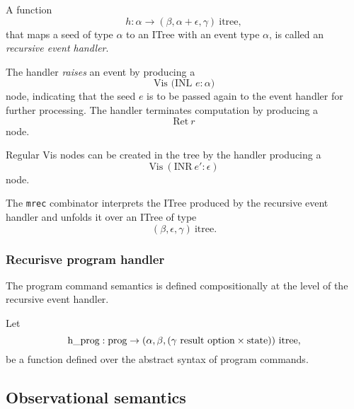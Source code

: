\documentclass[a4paper]{amsbook}
\begin{document}
A function
\begin{equation*}
  h : \alpha \to (\beta, \alpha + \epsilon, \gamma)\ \text{itree},
\end{equation*}
that maps a seed of type $\alpha$ to an ITree with an event type $\alpha$, is called an \emph{recursive event handler}.

The handler \emph{raises} an event by producing a
\begin{equation*}
  \text{Vis (INL } e:\alpha \text{)}
\end{equation*}
node, indicating that the seed $e$ is to be passed again to the event handler for further processing. The handler terminates computation by producing a
\begin{equation*}
  \text{Ret}\ r
\end{equation*}
node.

Regular Vis nodes can be created in the tree by the handler producing a
\begin{equation*}
  \text{Vis}\ (\text{INR}\ e':\epsilon)
\end{equation*}
node.

The \verb|mrec| combinator \cite{xia_executable_nodate} interprets the ITree produced by the recursive event handler and unfolds it over an ITree of type
\begin{equation*}
  (\beta, \epsilon, \gamma)\ \text{itree}.
\end{equation*}

\subsubsection{Recurisve program handler}
\label{sec:recur-progr-handl}

The program command semantics is defined compositionally at the level of the recursive event handler.

Let
\begin{equation*}
  \text{\lstinline!h\_prog!} : \text{prog} \to (\alpha,\beta,(\gamma\ \text{result option} \times \text{state}))\ \text{itree},
\end{equation*}
be a function defined over the abstract syntax of program commands.

\subsection{Observational semantics}
\label{sec:observ-semant}


\end{document}
